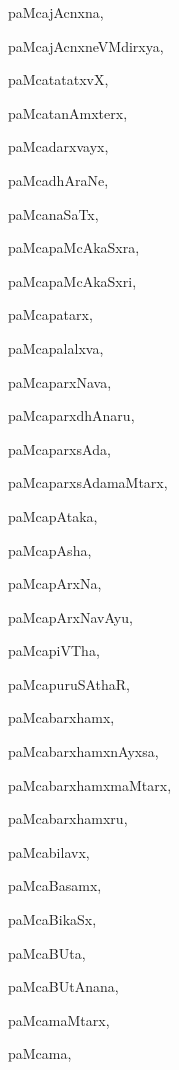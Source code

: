 \begin{multicols}{2}
{paMcajAcnxna}, \pageref{paMcajAcnxna}

{paMcajAcnxneVMdirxya}, \pageref{paMcajAcnxneVMdirxya}

{paMcatatatxvX}, \pageref{paMcatatatxvX}

{paMcatanAmxterx}, \pageref{paMcatanAmxterx}

{paMcadarxvayx}, \pageref{paMcadarxvayx}

{paMcadhAraNe}, \pageref{paMcadhAraNe}

{paMcanaSaTx}, \pageref{paMcanaSaTx}

{paMcapaMcAkaSxra}, \pageref{paMcapaMcAkaSxra}

{paMcapaMcAkaSxri}, \pageref{paMcapaMcAkaSxri}

{paMcapatarx}, \pageref{paMcapatarx}

{paMcapalalxva}, \pageref{paMcapalalxva}

{paMcaparxNava}, \pageref{paMcaparxNava}

{paMcaparxdhAnaru}, \pageref{paMcaparxdhAnaru}

{paMcaparxsAda}, \pageref{paMcaparxsAda}

{paMcaparxsAdamaMtarx}, \pageref{paMcaparxsAdamaMtarx}

{paMcapAtaka}, \pageref{paMcapAtaka}

{paMcapAsha}, \pageref{paMcapAsha}

{paMcapArxNa}, \pageref{paMcapArxNa}

{paMcapArxNavAyu}, \pageref{paMcapArxNavAyu}

{paMcapiVTha}, \pageref{paMcapiVTha}

{paMcapuruSAthaR}, \pageref{paMcapuruSAthaR}

{paMcabarxhamx}, \pageref{paMcabarxhamx}

{paMcabarxhamxnAyxsa}, \pageref{paMcabarxhamxnAyxsa}

{paMcabarxhamxmaMtarx}, \pageref{paMcabarxhamxmaMtarx}

{paMcabarxhamxru}, \pageref{paMcabarxhamxru}

{paMcabilavx}, \pageref{paMcabilavx}

{paMcaBasamx}, \pageref{paMcaBasamx}

{paMcaBikaSx}, \pageref{paMcaBikaSx}

{paMcaBUta}, \pageref{paMcaBUta2}

{paMcaBUtAnana}, \pageref{paMcaBUtAnana}

{paMcamaMtarx}, \pageref{paMcamaMtarx}

{paMcama}, \pageref{paMcama}


\end{multicols}
